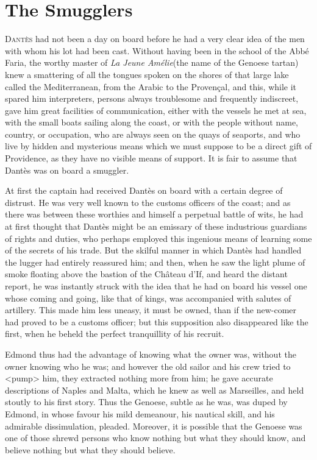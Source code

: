 \chapter{The Smugglers} 

 \lettrine{D}{antès} had not been a day on board before he had a very clear idea of the men with whom his lot had been cast. Without having been in the school of the Abbé Faria, the worthy master of \textit{La Jeune Amélie}(the name of the Genoese tartan) knew a smattering of all the tongues spoken on the shores of that large lake called the Mediterranean, from the Arabic to the Provençal, and this, while it spared him interpreters, persons always troublesome and frequently indiscreet, gave him great facilities of communication, either with the vessels he met at sea, with the small boats sailing along the coast, or with the people without name, country, or occupation, who are always seen on the quays of seaports, and who live by hidden and mysterious means which we must suppose to be a direct gift of Providence, as they have no visible means of support. It is fair to assume that Dantès was on board a smuggler. 

 At first the captain had received Dantès on board with a certain degree of distrust. He was very well known to the customs officers of the coast; and as there was between these worthies and himself a perpetual battle of wits, he had at first thought that Dantès might be an emissary of these industrious guardians of rights and duties, who perhaps employed this ingenious means of learning some of the secrets of his trade. But the skilful manner in which Dantès had handled the lugger had entirely reassured him; and then, when he saw the light plume of smoke floating above the bastion of the Château d'If, and heard the distant report, he was instantly struck with the idea that he had on board his vessel one whose coming and going, like that of kings, was accompanied with salutes of artillery. This made him less uneasy, it must be owned, than if the new-comer had proved to be a customs officer; but this supposition also disappeared like the first, when he beheld the perfect tranquillity of his recruit. 

 Edmond thus had the advantage of knowing what the owner was, without the owner knowing who he was; and however the old sailor and his crew tried to <pump> him, they extracted nothing more from him; he gave accurate descriptions of Naples and Malta, which he knew as well as Marseilles, and held stoutly to his first story. Thus the Genoese, subtle as he was, was duped by Edmond, in whose favour his mild demeanour, his nautical skill, and his admirable dissimulation, pleaded. Moreover, it is possible that the Genoese was one of those shrewd persons who know nothing but what they should know, and believe nothing but what they should believe. 

